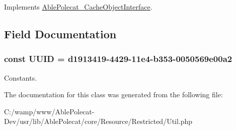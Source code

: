 Implements \hyperlink{interface_able_polecat___cache_object_interface_a3f2135f6ad45f51d075657f6d20db2cd}{Able\+Polecat\+\_\+\+Cache\+Object\+Interface}.



\subsection{Field Documentation}
\hypertarget{class_able_polecat___resource___restricted___util_a74b892c8c0b86bf9d04c5819898c51e7}{}
\subsubsection[{U\+U\+I\+D}]{\setlength{\rightskip}{0pt plus 5cm}const U\+U\+I\+D = \textquotesingle{}d1913419-\/4429-\/11e4-\/b353-\/0050569e00a2\textquotesingle{}}\label{class_able_polecat___resource___restricted___util_a74b892c8c0b86bf9d04c5819898c51e7}
Constants. 

The documentation for this class was generated from the following file\+:\begin{DoxyCompactItemize}
\item 
C\+:/wamp/www/\+Able\+Polecat-\/\+Dev/usr/lib/\+Able\+Polecat/core/\+Resource/\+Restricted/Util.\+php\end{DoxyCompactItemize}
